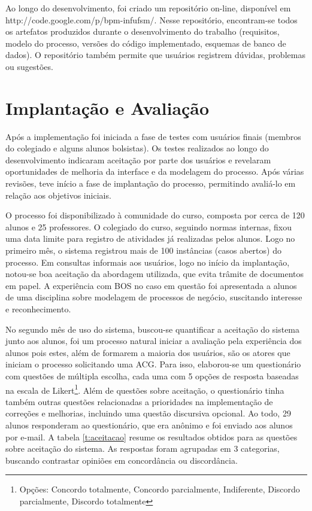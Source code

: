 \documentclass[12pt]{article}
\begin{document}
Ao longo do desenvolvimento, foi criado um repositório on-line, disponível em http://code.google.com/p/bpm-infufsm/. Nesse repositório, encontram-se todos os artefatos produzidos durante o desenvolvimento do trabalho (requisitos, modelo do processo, versões do código implementado, esquemas de banco de dados). O repositório também permite que usuários registrem dúvidas, problemas ou sugestões.



\section{Implantação e Avaliação}

Após a implementação foi iniciada a fase de testes com usuários finais (membros do colegiado e alguns alunos bolsistas). Os testes realizados ao longo do desenvolvimento indicaram aceitação por parte dos usuários e revelaram oportunidades de melhoria da interface e da modelagem do processo. Após várias revisões, teve início a fase de implantação do processo, permitindo avaliá-lo em relação aos objetivos iniciais.

O processo foi disponibilizado à comunidade do curso, composta por cerca de 120 alunos e 25 professores. O colegiado do curso, seguindo normas internas, fixou uma data limite para registro de atividades já realizadas pelos alunos. Logo no primeiro mês, o sistema registrou mais de 100 instâncias (casos abertos) do processo. Em consultas informais aos usuários, logo no início da implantação, notou-se boa aceitação da abordagem utilizada, que evita trâmite de documentos em papel.
A experiência com BOS no caso em questão foi apresentada a alunos de uma disciplina sobre modelagem de processos de negócio, suscitando interesse e reconhecimento.

No segundo mês de uso do sistema, buscou-se quantificar a aceitação do sistema junto aos alunos, foi um processo natural iniciar a avaliação pela experiência dos alunos pois estes, além de formarem a maioria dos usuários, são os atores que iniciam o processo solicitando uma ACG. Para isso, elaborou-se um questionário com questões de múltipla escolha, cada uma com 5 opções de resposta baseadas na escala de Likert\footnote{Opções: Concordo totalmente, Concordo parcialmente, Indiferente, Discordo parcialmente, Discordo totalmente}. Além de questões sobre aceitação, o questionário tinha também outras questões relacionadas a prioridades na implementação de correções e melhorias, incluindo uma questão discursiva opcional. Ao todo, 29 alunos responderam ao questionário, que era anônimo e foi enviado aos alunos por e-mail. A tabela \ref{t:aceitacao} resume os resultados obtidos para as questões sobre aceitação do sistema. As respostas foram agrupadas em 3 categorias, buscando contrastar opiniões em concordância ou discordância.
\end{document}
